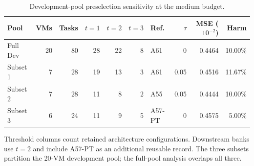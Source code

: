 \begin{table}[!htbp]
\centering\footnotesize
\caption{Development-pool preselection sensitivity at the medium budget.}\label{tab:s-preselection}
\begin{tabular}{lrrrrrlrrr}
\toprule
Pool & VMs & Tasks & $t=1$ & $t=2$ & $t=3$ & Ref. & $\tau$ & MSE ($10^{-2}$) & Harm\\\midrule
Full Dev & 20 & 80 & 28 & 22 & 8 & A61 & 0 & 0.4464 & 10.00\%\\
Subset 1 & 7 & 28 & 19 & 13 & 3 & A61 & 0.05 & 0.4516 & 11.67\%\\
Subset 2 & 7 & 28 & 11 & 8 & 2 & A55 & 0.05 & 0.4444 & 10.00\%\\
Subset 3 & 6 & 24 & 11 & 9 & 5 & A57-PT & 0 & 0.4575 & 5.00\%\\
\bottomrule\end{tabular}
\par\vspace{3pt}\begin{minipage}{\linewidth}\footnotesize Threshold columns count retained architecture configurations. Downstream banks use $t=2$ and include A57-PT as an additional reusable record. The three subsets partition the 20-VM development pool; the full-pool analysis overlaps all three.\end{minipage}
\end{table}

